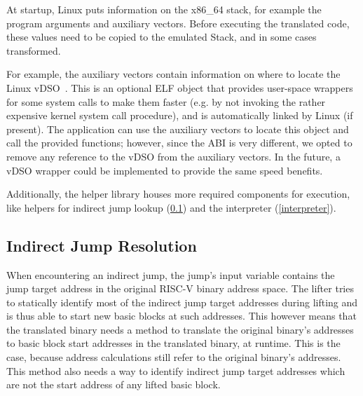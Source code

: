 \documentclass[course=eragp]{aspdoc}
\begin{document}
At startup, Linux puts information on the x86\_64 stack, for example the program arguments and auxiliary vectors. %
Before executing the translated code, these values need to be copied to the emulated Stack, and in some cases transformed.

For example, the auxiliary vectors contain information on where to locate the Linux vDSO~\cite{man_vdso}.
This is an optional ELF object that provides user-space wrappers for some system calls to make them faster (e.g. by not
invoking the rather expensive kernel system call procedure), and is automatically linked by Linux (if present).
The application can use the auxiliary vectors to locate this object and call the provided functions; however,
since the ABI is very different, we opted to remove any reference to the vDSO from the auxiliary vectors.
In the future, a vDSO wrapper could be implemented to provide the same speed benefits.

Additionally, the helper library houses more required components for execution, like helpers for indirect jump lookup
(\ref{ijump_resolution}) and the interpreter (\ref{interpreter}).


\subsection{Indirect Jump Resolution}\label{ijump_resolution}

When encountering an indirect jump, the jump's input variable contains the jump target address in the
original RISC-V binary address space. The lifter tries to statically identify most of the indirect jump target
addresses during lifting and is thus able to start new basic blocks at such addresses.
This however means that the translated binary needs a method to translate the original binary's addresses to basic block start
addresses in the translated binary, at runtime. This is the case, because address calculations still
refer to the original binary's addresses. This method also needs a way to identify
indirect jump target addresses which are not the start address of any lifted basic block.
\end{document}
